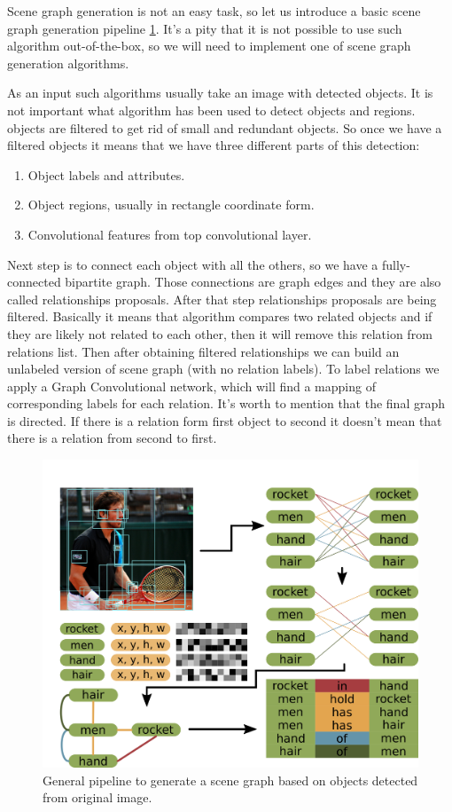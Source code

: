 Scene graph generation is not an easy task, so let us introduce a basic scene graph generation pipeline \ref{sgg-pipeline}. It's a pity that it is not possible to use such algorithm out-of-the-box, so we will need to implement one of scene graph generation algorithms.

As an input such algorithms usually take an image with detected objects. It is not important what algorithm has been used to detect objects and regions. objects are filtered to get rid of small and redundant objects. So once we have a filtered objects it means that we have three different parts of this detection:

\begin{enumerate}
    \item Object labels and attributes.
    \item Object regions, usually in rectangle coordinate form.
    \item Convolutional features from top convolutional layer.
\end{enumerate}

Next step is to connect each object with all the others, so we have a fully-connected bipartite graph. Those connections are graph edges and they are also called relationships proposals. After that step relationships proposals are being filtered. Basically it means that algorithm compares two related objects and if they are likely not related to each other, then it will remove this relation from relations list. Then after obtaining filtered relationships we can build an unlabeled version of scene graph (with no relation labels). To label relations we apply a Graph Convolutional network, which will find a mapping of corresponding labels for each relation. It's worth to mention that the final graph is directed. If there is a relation form first object to second it doesn't mean that there is a relation from second to first.

\begin{figure}[!h]
    \centering
    \includegraphics[width=\textwidth]{figure/sgg-pipeline.png}
    \caption{General pipeline to generate a scene graph based on objects detected from original image.}
    \label{sgg-pipeline}
\end{figure}

